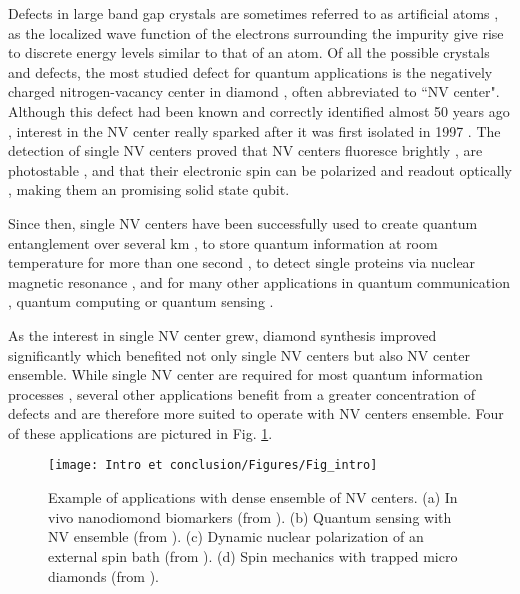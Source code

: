 \documentclass[a4paper, 11pt]{report}
\begin{document}
Defects in large band gap crystals are sometimes referred to as artificial atoms \citep{buluta2011natural}, as the localized wave function of the electrons surrounding the impurity  give rise to discrete energy levels similar to that of an atom. Of all the possible crystals and defects, the most studied defect for quantum applications is the negatively charged nitrogen-vacancy center in diamond \citep{aharonovich2016solid, de2021materials}, often abbreviated to ``NV center". Although this defect had been known and correctly identified almost 50 years ago \citep{davies1976optical}, interest in the NV center really sparked after it was first isolated in 1997 \citep{gruber1997scanning}. The detection of single NV centers proved that NV centers fluoresce brightly \citep{gruber1997scanning}, are photostable \citep{kurtsiefer2000stable}, and that their electronic spin can be polarized and readout optically \citep{jelezko2004observation}, making them an promising solid state qubit.

Since then, single NV centers have been successfully used to create quantum entanglement over several km \citep{hensen2015loophole}, to store quantum information at room temperature for more than one second \citep{maurer2012room}, to detect single proteins via nuclear magnetic resonance \citep{lovchinsky2016nuclear}, and for many other applications in quantum communication \citep{wehner2018quantum}, quantum computing \citep{de2021materials} or quantum sensing \citep{degen2017quantum}.

As the interest in single NV center grew, diamond synthesis improved significantly \citep{achard2020chemical, barry2020sensitivity, edmonds2020generation}  which benefited not only single NV centers but also NV center ensemble. While single NV center are required for most quantum information processes \citep{ladd2010quantum}, several other applications benefit from a greater concentration of defects and are therefore more suited to operate with NV centers ensemble. Four of these applications are pictured in Fig. \ref{shema introduction}.

\begin{figure}[h!]
\centering
\texttt{[image: Intro et conclusion/Figures/Fig\_intro]}
\caption{Example of applications with dense ensemble of NV centers. (a) In vivo nanodiomond biomarkers (from \citep{mohan2010vivo}). (b) Quantum sensing with NV ensemble (from \citep{ku2020imaging}). (c) Dynamic nuclear polarization of an external spin bath (from \citep{healey2021polarization}). (d) Spin mechanics with trapped micro diamonds (from \citep{delord2020spin}).}
\label{shema introduction}
\end{figure}
\end{document}
